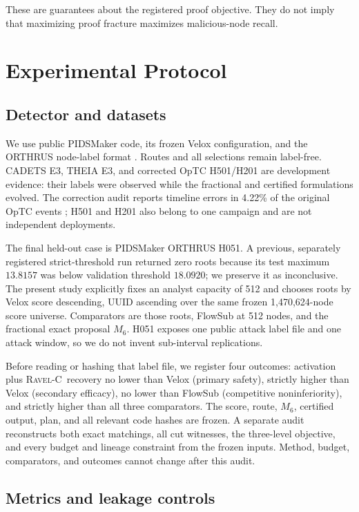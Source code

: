 \documentclass[runningheads]{llncs}
\newcommand{\ravelc}{\textsc{Ravel-C}}
\begin{document}
These are guarantees about the registered proof objective. They do not imply that maximizing proof fracture maximizes malicious-node recall.

\section{Experimental Protocol}

\subsection{Detector and datasets}

We use public PIDSMaker code, its frozen Velox configuration, and the ORTHRUS node-label format \cite{jiang2025orthrus,bilot2026pidsmaker}. Routes and all selections remain label-free. CADETS E3, THEIA E3, and corrected OpTC H501/H201 are development evidence: their labels were observed while the fractional and certified formulations evolved. The correction audit reports timeline errors in 4.22\% of the original OpTC events \cite{majorczyk2025newhope}; H501 and H201 also belong to one campaign and are not independent deployments.

The final held-out case is PIDSMaker ORTHRUS H051. A previous, separately registered strict-threshold run returned zero roots because its test maximum \(13.8157\) was below validation threshold \(18.0920\); we preserve it as inconclusive. The present study explicitly fixes an analyst capacity of 512 and chooses roots by Velox score descending, UUID ascending over the same frozen 1,470,624-node score universe. Comparators are those roots, FlowSub at 512 nodes, and the fractional exact proposal \(M_6\). H051 exposes one public attack label file and one attack window, so we do not invent sub-interval replications.

Before reading or hashing that label file, we register four outcomes: activation plus \ravelc\ recovery no lower than Velox (primary safety), strictly higher than Velox (secondary efficacy), no lower than FlowSub (competitive noninferiority), and strictly higher than all three comparators. The score, route, \(M_6\), certified output, plan, and all relevant code hashes are frozen. A separate audit reconstructs both exact matchings, all cut witnesses, the three-level objective, and every budget and lineage constraint from the frozen inputs. Method, budget, comparators, and outcomes cannot change after this audit.

\subsection{Metrics and leakage controls}
\end{document}
